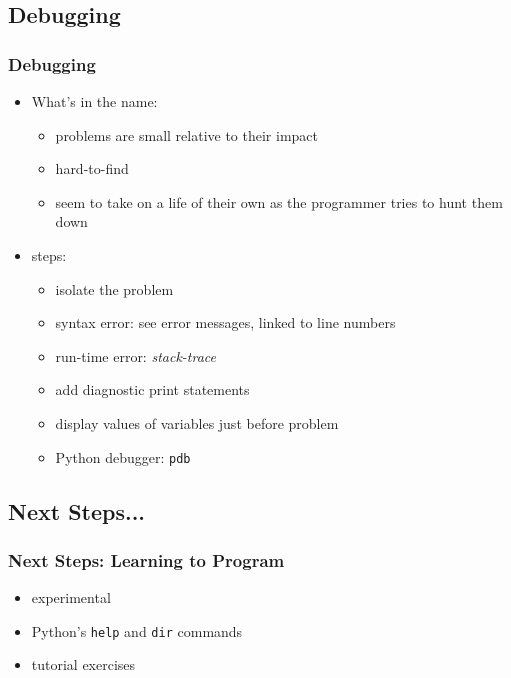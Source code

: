 \documentclass[handout]{beamer}
\begin{document}
\subsection{Debugging}

\begin{frame}
  \frametitle{Debugging}

  \begin{itemize}
  \item What's in the name:
    \begin{itemize}
    \item problems are small relative to their impact
    \item hard-to-find
    \item seem to take on a life of their own as the programmer tries to
      hunt them down
    \end{itemize}
  \item steps:
    \begin{itemize}
    \item isolate the problem
    \item syntax error: see error messages, linked to line numbers
    \item run-time error: \textit{stack-trace}
    \item add diagnostic print statements
    \item display values of variables just before problem
    \item Python debugger: \texttt{pdb}
    \end{itemize}
  \end{itemize}
\end{frame}

\subsection{Next Steps...}

\begin{frame}
\frametitle{Next Steps: Learning to Program}
\begin{itemize}
\item experimental
\item Python's \texttt{help} and \texttt{dir} commands
\item tutorial exercises
\end{itemize}
\end{frame}
\end{document}
